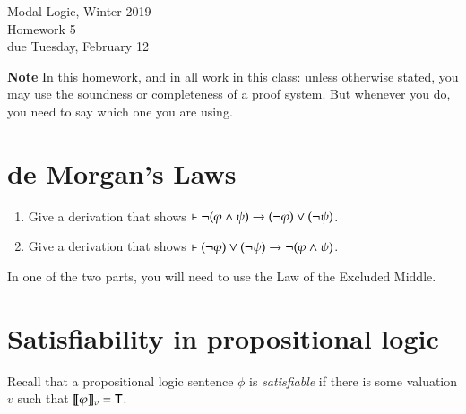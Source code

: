 \documentclass[12pt]{article}
\begin{document}
\begin{center}
{
\Large  Modal Logic, Winter 2019   \\
   Homework 5
\\
due Tuesday, February 12 \\
} 
\end{center}

{\bf Note} In this homework, and in all work in this class: unless otherwise stated,
you may use the soundness or completeness of a proof system.
But whenever you do, you need to say which one you are using.


\section{de Morgan's Laws}
 

\begin{enumerate}
\item Give a derivation that shows $\vdash\neg(\varphi\wedge\psi)\rightarrow (\neg \varphi)\vee (\neg\psi)$.
\item Give a derivation that shows $\vdash(\neg \varphi)\vee (\neg\psi) \rightarrow \neg(\varphi\wedge\psi)$.
\end{enumerate}
In one of the two parts, you will need to use the Law of the Excluded Middle.

\section{Satisfiability in propositional logic}
Recall that  a propositional logic sentence
$\phi$ is \emph{satisfiable} if there is some valuation $v$ such that $[\![\mbox{\em $\varphi$\/}]\!]_v ={\sf T}$.
\end{document}
